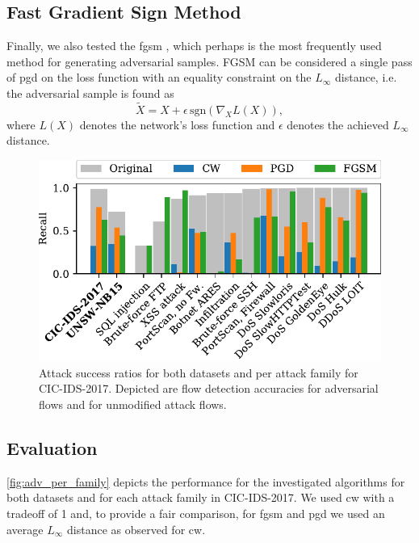 \documentclass[conference]{IEEEtran}
\begin{document}
\subsection{Fast Gradient Sign Method}
Finally, we also tested the \gls{fgsm} %
 \cite{goodfellow_explaining_2015}, which perhaps is the most frequently used method for generating adversarial samples. FGSM can be considered a single pass of \gls{pgd} on the loss function with an equality constraint on the $L_\infty$ distance, i.e. the adversarial sample is found as
\begin{equation}
\tilde X = X + \epsilon \, \text{sgn}( \nabla_X L(X)),
\end{equation}
where $L(X)$ denotes the network's loss function and $\epsilon$ denotes the achieved $L_\infty$ distance.

\begin{figure}[t]
\includegraphics[width=\columnwidth]{../plots/adv_comparison/adv_comparison_17.pdf}
\caption{Attack success ratios for both datasets and per attack family for CIC-IDS-2017. Depicted are flow detection accuracies for adversarial flows and for unmodified attack flows.}
\label{fig:adv_per_family}
\end{figure}


\subsection{Evaluation}
\autoref{fig:adv_per_family} depicts the performance for the investigated algorithms for both datasets and for each attack family in CIC-IDS-2017.
We used \gls{cw} with a tradeoff of 1 and, to provide a fair comparison, for \gls{fgsm} and \gls{pgd} we used an average $L_\infty$ distance as observed for \gls{cw}.
\end{document}
